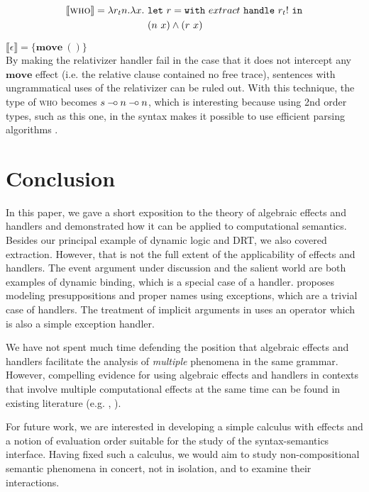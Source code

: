 \documentclass[a4paper,11pt]{easychair}
\newcommand{\sem}[1]{\llbracket #1 \rrbracket}
\newcommand{\keyword}[1]{\texttt{#1}}
\newcommand{\effect}[1]{\textbf{#1}}
\newcommand{\handle}[2]{\keyword{with}\ #1\ \keyword{handle}\ #2}
\def\limp {\mathbin{{-}\mkern-3.5mu{\circ}}}
\begin{document}
\begin{align*}
  \sem{\textsc{who}} = \lambda r_t n. \lambda x.\ & \keyword{let}\ r =
  \handle{extract}{r_t!}\ \keyword{in} \\
   & (n\ x) \land (r\ x) \\
\end{align*}

\vspace{-8mm}

\hspace{2.5cm} $ \sem{\epsilon} = \{ \effect{move}\ () \} $ \\

By making the relativizer handler fail in the case that it does not intercept
any $\effect{move}$ effect (i.e. the relative clause contained no free trace),
sentences with ungrammatical uses of the relativizer can be ruled out. With
this technique, the type of \textsc{who} becomes $s \limp n \limp n$, which is
interesting because using 2nd order types, such as this one, in the syntax
makes it possible to use efficient parsing algorithms
\citep{kanazawa2007parsing}.


\section{Conclusion}

In this paper, we gave a short exposition to the theory of algebraic effects
and handlers and demonstrated how it can be applied to computational
semantics. Besides our principal example of dynamic logic and DRT, we also
covered extraction. However, that is not the full extent of the applicability
of effects and handlers. The event argument under discussion
\citep{qian2011event} and the salient world are both examples of dynamic
binding, which is a special case of a handler. \citet{lebedeva2012expression}
proposes modeling presuppositions and proper names using exceptions, which are
a trivial case of handlers. The treatment of implicit arguments in
\citet{blom2012implicit} uses an operator which is also a simple exception
handler.

We have not spent much time defending the position that algebraic effects and
handlers facilitate the analysis of \emph{multiple} phenomena in the same
grammar. However, compelling evidence for using algebraic effects and handlers
in contexts that involve multiple computational effects at the same time can
be found in existing literature (e.g. \citet{kiselyov2013extensible},
\citet{cartwright1994extensible}).

For future work, we are interested in developing a simple calculus with
effects and a notion of evaluation order suitable for the study of the
syntax-semantics interface. Having fixed such a calculus, we would aim to
study non-compositional semantic phenomena in concert, not in isolation, and
to examine their interactions.




\end{document}
